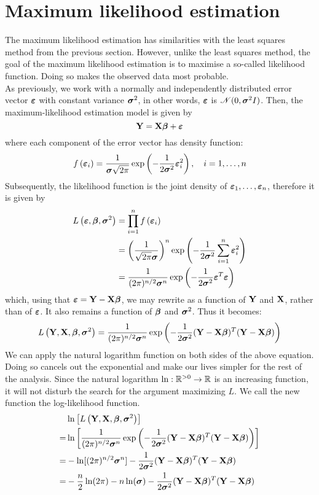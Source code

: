 \section{Maximum likelihood estimation}
\label{section: maximum likelihood}
The maximum likelihood estimation has similarities with the least squares method  from the previous section. However, unlike the least squares method, the goal of the maximum likelihood estimation is to maximise a so-called likelihood function. Doing so makes the observed data most probable. \\
As previously, we work with a normally and independently distributed error vector \(\boldsymbol{\varepsilon}\) with constant variance \(\boldsymbol{\sigma}^2\), in other words, \(\boldsymbol{\varepsilon}\) is \(\mathscr{N}(0, \boldsymbol{\sigma}^2 I)\). Then, the maximum-likelihood estimation model is given by
\[
    \mathbf{Y} = \mathbf{X} \boldsymbol{\beta} + \boldsymbol{\varepsilon}
\]
where each component of the error vector has density function:
\[
    f \left(\boldsymbol{\varepsilon}_{i}\right) = \frac{1}{\boldsymbol{\sigma} \sqrt{2 \pi}} \exp \left(-\frac{1}{2 \boldsymbol{\sigma}^{2}} \boldsymbol{\varepsilon}_{i}^{2}\right), \quad i = 1, \ldots, n
\]
Subsequently, the likelihood function is the joint density of \(\boldsymbol{\varepsilon}_1, \ldots, \boldsymbol{\varepsilon}_n\), therefore it is given by
\begin{align*}
    L\left(\boldsymbol{\varepsilon}, \boldsymbol{\beta}, \boldsymbol{\sigma}^{2}\right)
     & = \prod_{i=1}^{n} f\left(\boldsymbol{\varepsilon}_{i}\right)                                                                        \\
     & = \left( \frac{1}{\sqrt{2 \pi} \boldsymbol{\sigma}} \right)^n \exp \left(-\frac{1}{2 \boldsymbol{\sigma}^{2}} \sum_{i=1}^{n} \boldsymbol{\varepsilon}_i^2 \right) \\
     & = \frac{1}{(2 \pi)^{n / 2} \boldsymbol{\sigma}^{n}} \exp \left(-\frac{1}{2 \boldsymbol{\sigma}^{2}} \boldsymbol{\varepsilon}^T \boldsymbol{\varepsilon}\right)                        \\
\end{align*}
which, using that \(\boldsymbol{\varepsilon} = \mathbf{Y} - \mathbf{X} \boldsymbol{\beta}\), we may rewrite as a function of \(\mathbf{Y}\) and \(\mathbf{X}\), rather than of \(\boldsymbol{\varepsilon}\). It also remains a function of \(\boldsymbol{\beta}\) and \(\boldsymbol{\sigma}^2\). Thus it becomes:
\[
    L\left(\mathbf{Y}, \mathbf{X}, \boldsymbol{\beta}, \boldsymbol{\sigma}^{2}\right) = \frac{1}{(2 \pi)^{n / 2} \boldsymbol{\sigma}^{n}} \exp \left(-\frac{1}{2 \boldsymbol{\sigma}^{2}} ( \mathbf{Y} - \mathbf{X} \boldsymbol{\beta} )^T ( \mathbf{Y} - \mathbf{X} \boldsymbol{\beta} )\right)
\]
We can apply the natural logarithm function on both sides of the above equation. Doing so cancels out the exponential and make our lives simpler for the rest of the analysis. Since the natural logarithm \(\ln: \mathbb{R}^{>0} \to \mathbb{R}\) is an increasing function, it will not disturb the search for the argument maximizing \(L\). We call the new function the log-likelihood function.
\begin{align*}
      & \ln \left[ L\left(\mathbf{Y}, \mathbf{X}, \boldsymbol{\beta}, \boldsymbol{\sigma}^{2}\right) \right]                                                                           \\
    = & \ln \left[ \frac{1}{(2 \pi)^{n / 2} \boldsymbol{\sigma}^{n}} \exp \left(-\frac{1}{2 \boldsymbol{\sigma}^{2}} ( \mathbf{Y} - \mathbf{X} \boldsymbol{\beta} )^T ( \mathbf{Y} - \mathbf{X} \boldsymbol{\beta} )\right) \right] \\
    = & - \ln [ (2 \pi)^{n / 2} \boldsymbol{\sigma}^{n} ] - \frac{1}{2 \boldsymbol{\sigma}^{2}} ( \mathbf{Y} - \mathbf{X} \boldsymbol{\beta} )^T ( \mathbf{Y} - \mathbf{X} \boldsymbol{\beta} )                                     \\
    = & - \frac{n}{2} \ln(2 \pi) -n \ln(\boldsymbol{\sigma}) - \frac{1}{2 \boldsymbol{\sigma}^{2}} ( \mathbf{Y} - \mathbf{X} \boldsymbol{\beta} )^T ( \mathbf{Y} - \mathbf{X} \boldsymbol{\beta} )                                  \\
\end{align*}
